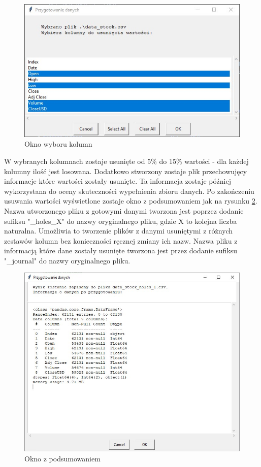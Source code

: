 \documentclass[12pt,twoside]{article}
\begin{document}
\begin{figure}[ht]
	\centering
	\includegraphics[width=12cm]{img/03.jpg}
	\caption{Okno wyboru kolumn}
\label{Fig:gen_col}
\end{figure}
\FloatBarrier

W wybranych kolumnach zostaje usunięte od 5\%
do 15\% wartości - dla każdej kolumny ilość jest losowana.
Dodatkowo stworzony zostaje plik przechowujęcy informacje które wartości zostały usunięte.
Ta informacja zostaje później wykorzystana do oceny skuteczności wypełnienia zbioru danych.
Po zakończeniu usuwania wartości wyświetlone zostaje okno z podsumowaniem jak na rysunku \ref{Fig:gen_end}.
Nazwa utworzonego pliku z gotowymi danymi tworzona jest
poprzez dodanie sufiksu "\_holes\_X" do nazwy oryginalnego pliku, gdzie X to kolejna liczba naturalna.
Umożliwia to tworzenie plików z danymi usuniętymi z różnych zestawów kolumn bez konieczności ręcznej zmiany ich nazw.
Nazwa pliku z informacją które dane zostały usunięte tworzona jest
przez dodanie sufiksu "\_journal" do nazwy oryginalnego pliku.

\begin{figure}[ht]
	\centering
	\includegraphics[width=12cm]{img/04.jpg}
	\caption{Okno z podsumowaniem}
\label{Fig:gen_end}
\end{figure}
\FloatBarrier
\end{document}
